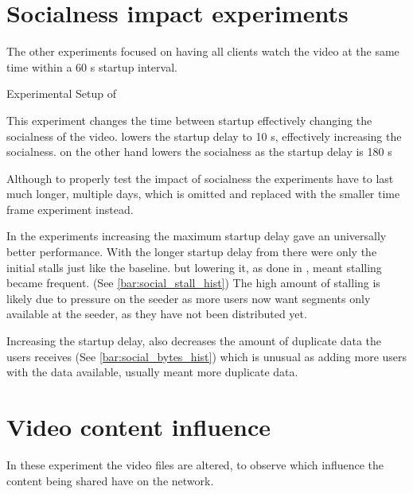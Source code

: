 \if{}

\fi

\FloatBarrier \section{Socialness impact experiments}
\label{sec:eval_socialness}
The other experiments focused on having all clients watch the video at the same time within a 60 \ac{s} startup interval.

\begin{table}[!htbp]
    \myfloatalign
    \caption[Experimental Setup of Socialness]{Experimental Setup of }
    \label{tab:exp_overview_socialness}
    
\end{table}

This experiment changes the time between startup effectively changing the socialness of the video.  lowers the startup delay to 10 \ac{s}, effectively increasing the socialness.  on the other hand lowers the socialness as the startup delay is 180 \ac{s}

Although to properly test the impact of socialness the experiments have to last much longer, multiple days, which is omitted and replaced with the smaller time frame experiment instead.

In the experiments increasing the maximum startup delay gave an universally better performance. With the longer startup delay from  there were only the initial stalls just like the baseline. but lowering it, as done in , meant stalling became frequent. (See \autoref{bar:social_stall_hist}) The high amount of stalling is likely due to pressure on the seeder as more users now want segments only available at the seeder, as they have not been distributed yet.

Increasing the startup delay, also decreases the amount of duplicate data the users receives (See \autoref{bar:social_bytes_hist}) which is unusual as adding more users with the data available, usually meant more duplicate data. %

\if{}


\fi

\FloatBarrier 
\section{Video content influence}
\label{sec:eval_video}
In these experiment the video files are altered, to observe which influence the content being shared have on the network.

